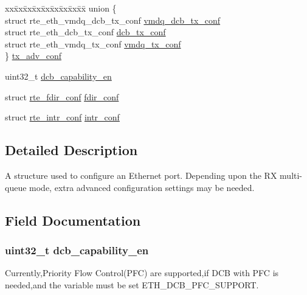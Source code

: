 \begin{DoxyCompactItemize}
\begin{tabbing}
\end{tabbing}\item 
\begin{tabbing}
xx\=xx\=xx\=xx\=xx\=xx\=xx\=xx\=xx\=\kill
union \{\\
\>struct rte\_eth\_vmdq\_dcb\_tx\_conf \hyperlink{structrte__eth__conf_ab8442ca78157e2e4ab788ee7066c4022}{vmdq\_dcb\_tx\_conf}\\
\>struct rte\_eth\_dcb\_tx\_conf \hyperlink{structrte__eth__conf_af9544423109c0c107ca74d73d483e703}{dcb\_tx\_conf}\\
\>struct rte\_eth\_vmdq\_tx\_conf \hyperlink{structrte__eth__conf_afac8cacc119c6d4e8fcae2c982b72b97}{vmdq\_tx\_conf}\\
\} \hyperlink{structrte__eth__conf_a55469f11d3c2e6c76488152651bcf464}{tx\_adv\_conf}\\

\end{tabbing}\item 
uint32\+\_\+t \hyperlink{structrte__eth__conf_a9ddd88820f8279124658f56f3bb16e1d}{dcb\+\_\+capability\+\_\+en}
\item 
struct \hyperlink{structrte__fdir__conf}{rte\+\_\+fdir\+\_\+conf} \hyperlink{structrte__eth__conf_a7b34faaa974b49846ba99f27f5c7ad5f}{fdir\+\_\+conf}
\item 
struct \hyperlink{structrte__intr__conf}{rte\+\_\+intr\+\_\+conf} \hyperlink{structrte__eth__conf_a9fad7bac275e3526e2a3708f70205b4c}{intr\+\_\+conf}
\end{DoxyCompactItemize}


\subsection{Detailed Description}
A structure used to configure an Ethernet port. Depending upon the R\+X multi-\/queue mode, extra advanced configuration settings may be needed. 

\subsection{Field Documentation}
\hypertarget{structrte__eth__conf_a9ddd88820f8279124658f56f3bb16e1d}{}
\subsubsection[{dcb\+\_\+capability\+\_\+en}]{\setlength{\rightskip}{0pt plus 5cm}uint32\+\_\+t dcb\+\_\+capability\+\_\+en}\label{structrte__eth__conf_a9ddd88820f8279124658f56f3bb16e1d}
Currently,Priority Flow Control(\+P\+F\+C) are supported,if D\+C\+B with P\+F\+C is needed,and the variable must be set E\+T\+H\+\_\+\+D\+C\+B\+\_\+\+P\+F\+C\+\_\+\+S\+U\+P\+P\+O\+R\+T. \hypertarget{structrte__eth__conf_afa63f7644ae1693b8a809ef99cb70d77}{}
